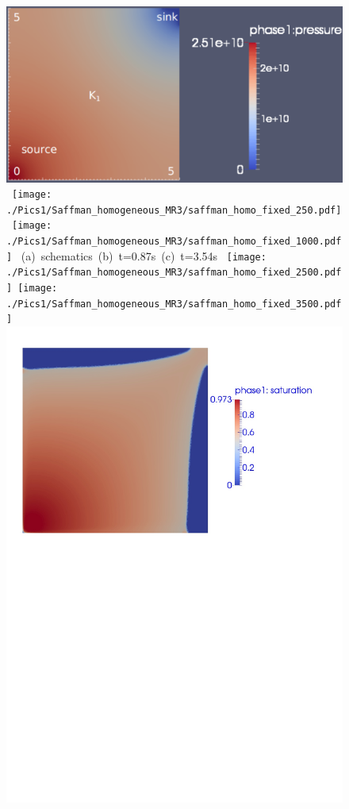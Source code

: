 \begin{landscape}
\begin{figure}[ht] 
\vbox{\vspace{-1cm}
\hbox{\includegraphics[width=.37\textwidth]{./Pics1/Saffman_homogeneous_MR3/saffman_homo_fixed_2b.pdf}
      \texttt{[image: ./Pics1/Saffman\_homogeneous\_MR3/saffman\_homo\_fixed\_250.pdf]}
      \texttt{[image: ./Pics1/Saffman\_homogeneous\_MR3/saffman\_homo\_fixed\_1000.pdf]}}
\vspace{0.cm}
\hbox{\hspace{2.5cm} (a) schematics \hspace{3.cm} (b) t=0.87s \hspace{2.75cm} (c) t=3.54s}
\vspace{0.5cm}
\hbox{
      \texttt{[image: ./Pics1/Saffman\_homogeneous\_MR3/saffman\_homo\_fixed\_2500.pdf]}
      \texttt{[image: ./Pics1/Saffman\_homogeneous\_MR3/saffman\_homo\_fixed\_3500.pdf]} 
      \includegraphics[width=.6\textwidth]{./Pics1/Saffman_homogeneous_MR3/saffman_homo_fixed_d5803_endb.pdf}}
}
\end{figure}
\end{landscape}
